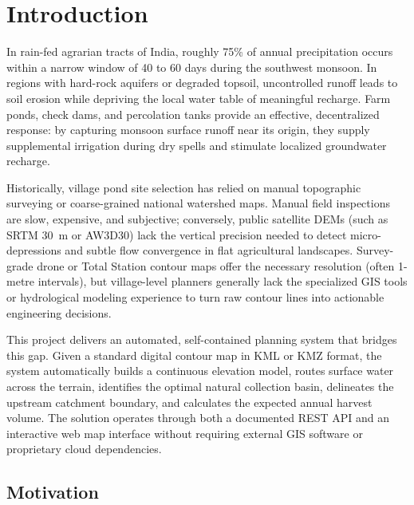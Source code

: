 \documentclass[manuscript,screen,review]{acmart}
\begin{document}
\section{Introduction}
\label{sec:intro}

In rain-fed agrarian tracts of India, roughly 75\% of annual precipitation occurs
within a narrow window of 40 to 60 days during the southwest monsoon. In regions with
hard-rock aquifers or degraded topsoil, uncontrolled runoff leads to soil erosion while
depriving the local water table of meaningful recharge. Farm ponds, check dams, and
percolation tanks provide an effective, decentralized response: by capturing monsoon
surface runoff near its origin, they supply supplemental irrigation during dry spells and
stimulate localized groundwater recharge.

Historically, village pond site selection has relied on manual topographic surveying or
coarse-grained national watershed maps. Manual field inspections are slow, expensive, and
subjective; conversely, public satellite DEMs (such as SRTM 30~m or AW3D30) lack the vertical
precision needed to detect micro-depressions and subtle flow convergence in flat agricultural
landscapes. Survey-grade drone or Total Station contour maps offer the necessary resolution
(often 1-metre intervals), but village-level planners generally lack the specialized GIS tools
or hydrological modeling experience to turn raw contour lines into actionable engineering decisions.

This project delivers an automated, self-contained planning system that bridges this gap.
Given a standard digital contour map in KML or KMZ format, the system automatically builds
a continuous elevation model, routes surface water across the terrain, identifies the optimal
natural collection basin, delineates the upstream catchment boundary, and calculates the expected
annual harvest volume. The solution operates through both a documented REST API and an interactive
web map interface without requiring external GIS software or proprietary cloud dependencies.

\subsection{Motivation}
\end{document}
